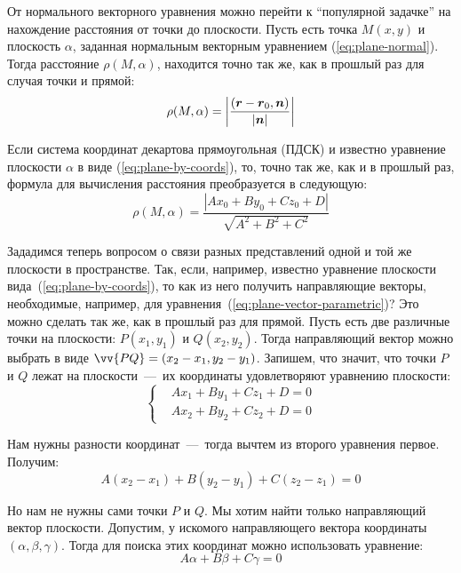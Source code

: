 \documentclass[a4paper,12pt]{article}
\begin{document}
  От нормального векторного уравнения можно перейти к ``популярной задачке'' на нахождение расстояния от точки до плоскости.
  Пусть есть точка $M(x, y)$ и плоскость $\alpha$, заданная нормальным векторным уравнением (\ref{eq:plane-normal}).
  Тогда расстояние $\rho(M, \alpha)$, находится точно так же, как в прошлый раз для случая точки и прямой:
  \begin{equation}\label{eq:distance-from-point-to-plane}
    \rho(M, \alpha) = \left|\frac{(\boldsymbol r - \boldsymbol r_0, \boldsymbol n)}{|\boldsymbol n|}\right|
  \end{equation}
  
  Если система координат декартова прямоугольная (ПДСК) и известно уравнение плоскости $\alpha$ в виде (\ref{eq:plane-by-coords}), то, точно так же, как и в прошлый раз, формула для вычисления расстояния преобразуется в следующую:
  \[
    \rho(M, \alpha) = \frac{|A x_0 + B y_0 + C z_0 + D|}{\sqrt{A^2 + B^2 + C^2}}
  \]
  
  Зададимся теперь вопросом о связи разных представлений одной и той же плоскости в пространстве.
  Так, если, например, известно уравнение плоскости вида~(\ref{eq:plane-by-coords}), то как из него получить направляющие векторы, необходимые, например, для уравнения~(\ref{eq:plane-vector-parametric})?
  Это можно сделать так же, как в прошлый раз для прямой.
  Пусть есть две различные точки на плоскости: $P(x_1, y_1)$ и $Q(x_2, y_2)$.
  Тогда направляющий вектор можно выбрать в виде $\vv{PQ} \hm= (x_2 \hm- x_1, y_2 \hm- y_1)$.
  Запишем, что значит, что точки $P$ и $Q$ лежат на плоскости~---~их координаты удовлетворяют уравнению плоскости:
  \[
    \left\{
      \begin{aligned}
        &A x_1 + B y_1 + C z_1 + D = 0\\
        &A x_2 + B y_2 + C z_2 + D = 0
      \end{aligned}
    \right.
  \]
  
  Нам нужны разности координат~---~тогда вычтем из второго уравнения первое.
  Получим:
  \[
    A(x_2 - x_1) + B(y_2 - y_1) + C(z_2 - z_1) = 0
  \]
  
  Но нам не нужны сами точки $P$ и $Q$.
  Мы хотим найти только направляющий вектор плоскости.
  Допустим, у искомого направляющего вектора координаты $(\alpha, \beta, \gamma)$.
  Тогда для поиска этих координат можно использовать уравнение:
  \begin{equation}\label{eq:search-for-napravlayushii}
    \boxed{
      A \alpha + B \beta + C \gamma = 0
    }
  \end{equation}
  
\end{document}
